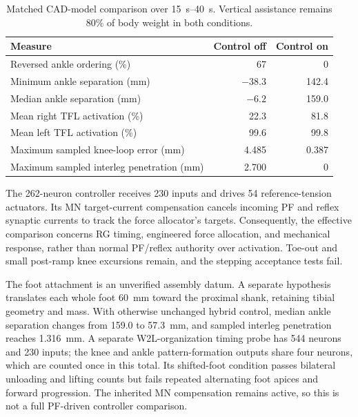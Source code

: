 \begin{table}[htbp]
\centering\small
\caption[Matched CAD-model separation-control comparison]{Matched CAD-model comparison over \qtyrange{15}{40}{\second}. Vertical assistance remains 80\% of body weight in both conditions.}
\label{tab:cad_abductor}
\begin{tabularx}{\textwidth}{@{}>{\raggedright\arraybackslash}Xrr@{}}
\toprule
Measure & Control off & Control on \\
\midrule
Reversed ankle ordering (\%) & 67 & 0 \\
Minimum ankle separation (\unit{\mm}) & $-38.3$ & 142.4 \\
Median ankle separation (\unit{\mm}) & $-6.2$ & 159.0 \\
Mean right TFL activation (\%) & 22.3 & 81.8 \\
Mean left TFL activation (\%) & 99.6 & 99.8 \\
Maximum sampled knee-loop error (\unit{\mm}) & 4.485 & 0.387 \\
Maximum sampled interleg penetration (\unit{\mm}) & 2.700 & 0 \\
\bottomrule
\end{tabularx}
\end{table}

The 262-neuron controller receives 230 inputs and drives 54 reference-tension actuators. Its MN target-current compensation cancels incoming PF and reflex synaptic currents to track the force allocator's targets. Consequently, the effective comparison concerns RG timing, engineered force allocation, and mechanical response, rather than normal PF/reflex authority over activation. Toe-out and small post-ramp knee excursions remain, and the stepping acceptance tests fail.

The foot attachment is an unverified assembly datum. A separate hypothesis translates each whole foot \qty{60}{\mm} toward the proximal shank, retaining tibial geometry and mass. With otherwise unchanged hybrid control, median ankle separation changes from 159.0 to \qty{57.3}{\milli\meter}, and sampled interleg penetration reaches \qty{1.316}{\milli\meter}. A separate W2L-organization timing probe has 544 neurons and 230 inputs; the knee and ankle pattern-formation outputs share four neurons, which are counted once in this total. Its shifted-foot condition passes bilateral unloading and lifting counts but fails repeated alternating foot apices and forward progression. The inherited MN compensation remains active, so this is not a full PF-driven controller comparison.

